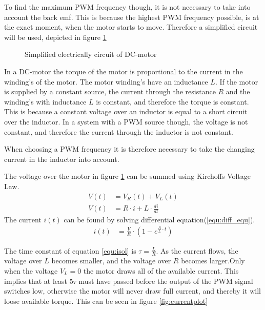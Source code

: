 \documentclass[../../../Main]{subfiles}
\begin{document}
To find the maximum PWM frequency though, it is not necessary to take into account the back emf. This is because the highest PWM frequency possible, is at the exact moment, when the motor starts to move. Therefore a simplified circuit will be used, depicted in figure \ref{fig:electrical} 

\begin{figure}[H]
	\center
    \def\svgwidth{0.4\textwidth}
	
	\caption{Simplified electrically circuit of DC-motor}
  \label{fig:electrical}
\end{figure}


In a DC-motor the torque of the motor is proportional to the current in the winding's of the motor. The motor winding's have an inductance $L$.
If the motor is supplied by a constant source, the current through the resistance $R$ and the winding's with inductance $L$ is constant, and therefore the torque is constant. This is because a constant voltage over an inductor is equal to a short circuit over the inductor. 
In a system with a PWM source though, the voltage is not constant, and therefore the current through the inductor is not constant.

When choosing a PWM frequency it is therefore necessary to take the changing current in the inductor into account. 

The voltage over the motor in figure \ref{fig:electrical} can be summed using Kirchoffs Voltage Law. 
\begin{align}
	V(t) &= V_R(t) + V_L(t)\\
	V(t) &= R \cdot i + L \cdot \frac{di}{dt}
	\label{equ:diff_equ}
\end{align}
The current $i(t)$ can be found by solving differential equation(\ref{equ:diff_equ}).   
\begin{align}
	i(t) &=\frac{V}{R} \cdot (1-e^{\frac{R}{L} \cdot t})
	\label{equ:isol}
\end{align}

The time constant of equation \ref{equ:isol} is $\tau = \frac{L}{R}$.
As the current flows, the voltage over $L$ becomes smaller, and the voltage over $R$ becomes larger.Only when the voltage $V_L = 0$ the motor draws all of the available current. This implies that at least $5\tau$ must have passed before the output of the PWM signal switches low, otherwise the motor will never draw full current, and thereby it will loose available  torque. This can be seen in figure \ref{fig:currentplot}
\end{document}
